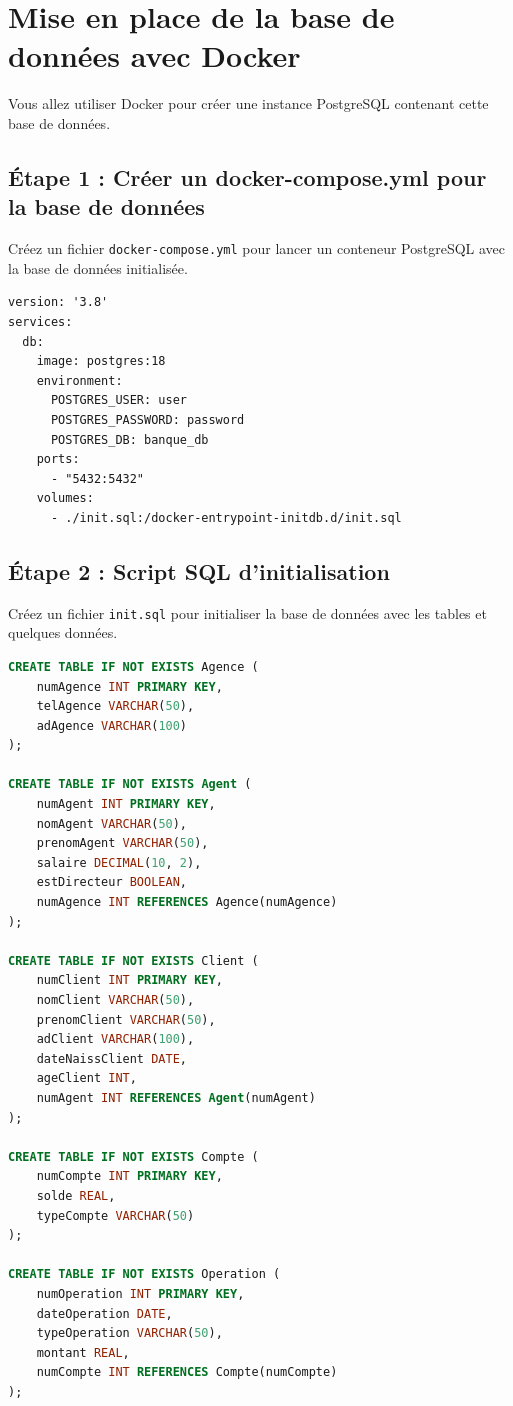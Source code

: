 \documentclass[11pt]{article}
\begin{document}
\section{Mise en place de la base de données avec Docker}
Vous allez utiliser Docker pour créer une instance PostgreSQL contenant cette base de données.

\subsection{Étape 1 : Créer un docker-compose.yml pour la base de données}
Créez un fichier \texttt{docker-compose.yml} pour lancer un conteneur PostgreSQL avec la base de données initialisée.

\begin{lstlisting}
version: '3.8'
services:
  db:
    image: postgres:18
    environment:
      POSTGRES_USER: user
      POSTGRES_PASSWORD: password
      POSTGRES_DB: banque_db
    ports:
      - "5432:5432"
    volumes:
      - ./init.sql:/docker-entrypoint-initdb.d/init.sql
\end{lstlisting}

\subsection{Étape 2 : Script SQL d'initialisation}
Créez un fichier \texttt{init.sql} pour initialiser la base de données avec les tables et quelques données.

\begin{lstlisting}[language=SQL,breaklines=true]
CREATE TABLE IF NOT EXISTS Agence (
    numAgence INT PRIMARY KEY,
    telAgence VARCHAR(50),
    adAgence VARCHAR(100)
);

CREATE TABLE IF NOT EXISTS Agent (
    numAgent INT PRIMARY KEY,
    nomAgent VARCHAR(50),
    prenomAgent VARCHAR(50),
    salaire DECIMAL(10, 2),
    estDirecteur BOOLEAN,
    numAgence INT REFERENCES Agence(numAgence)
);

CREATE TABLE IF NOT EXISTS Client (
    numClient INT PRIMARY KEY,
    nomClient VARCHAR(50),
    prenomClient VARCHAR(50),
    adClient VARCHAR(100),
    dateNaissClient DATE,
    ageClient INT,
    numAgent INT REFERENCES Agent(numAgent)
);

CREATE TABLE IF NOT EXISTS Compte (
    numCompte INT PRIMARY KEY,
    solde REAL,
    typeCompte VARCHAR(50)
);

CREATE TABLE IF NOT EXISTS Operation (
    numOperation INT PRIMARY KEY,
    dateOperation DATE,
    typeOperation VARCHAR(50),
    montant REAL,
    numCompte INT REFERENCES Compte(numCompte)
);
\end{lstlisting}
\end{document}
